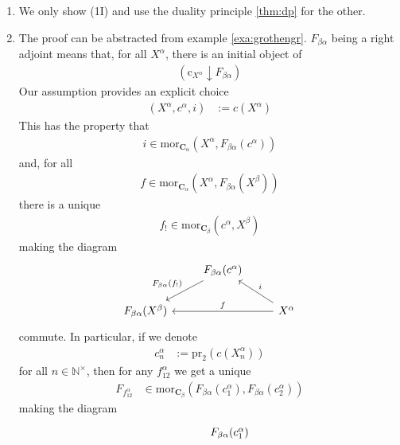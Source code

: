 \begin{prf}
\begin{enumerate}
\item[(1T)]
We only show (1I) and use the duality principle \ref{thm:dp} for the other.
\item[(1I)]
The proof can be abstracted from example \ref{exa:grothengr}.
$F_{\beta\alpha}$ being a right adjoint means that, for all $X^{\alpha}$, there is an initial object of
\begin{align*}
  \left(
    \mathrm{c}_{X^{\alpha}}
    \downarrow
    F_{\beta\alpha}
  \right)
\end{align*}
Our assumption provides an explicit choice
\begin{align*}
  (X^{\alpha},c^{\alpha},i)
  &:=
  c(X^{\alpha})
\end{align*}
This has the property that
\begin{align*}
  i
  \in
  \mathrm{mor}_{\mathbf{C}_{\alpha}}
  \left(
    X^{\alpha},
    F_{\beta\alpha}(c^{\alpha})
  \right)
\end{align*}
and, for all
\begin{align*}
  f
  \in
  \mathrm{mor}_{\mathbf{C}_{\alpha}}
  \left(
    X^{\alpha},
    F_{\beta\alpha}(X^{\beta})
  \right)
\end{align*}
there is a unique
\begin{align*}
  f_{!}
  \in
  \mathrm{mor}_{\mathbf{C}_{\beta}}
  \left(
    c^{\alpha},
    X^{\beta}
  \right)
\end{align*}
making the diagram
\[
\begin{tikzcd}[sep=normal]
  &
  F_{\beta\alpha}(c^{\alpha})
  \arrow[swap]{dl}{F_{\beta\alpha}(f_{!})}
  &
  \\
  F_{\beta\alpha}(X^{\beta})
  &
  &
  X^{\alpha}
  \arrow[swap]{ll}{f}
  \arrow[swap]{ul}{i}
\end{tikzcd}
\]
commute.
In particular, if we denote
\begin{align*}
  c_{n}^{\alpha}
  &:=
  \mathrm{pr}_{2}
  \left(
    c(X_{n}^{\alpha})
  \right)
\end{align*}
for all $n \in \mathbb{N}^{\times}$, then for any $f_{12}^{\alpha}$ we get a unique
\begin{align*}
  F_{f_{12}^{\alpha}}
  &\in
  \mathrm{mor}_{\mathbf{C}_{\beta}}
  \left(
    F_{\beta\alpha}(c_{1}^{\alpha}),
    F_{\beta\alpha}(c_{2}^{\alpha})
  \right)
\end{align*}
making the diagram
\[
\begin{tikzcd}[sep=large]
  &
  F_{\beta\alpha}(c_{1}^{\alpha})

\end{tikzcd}\]
\end{enumerate}
\end{prf}
